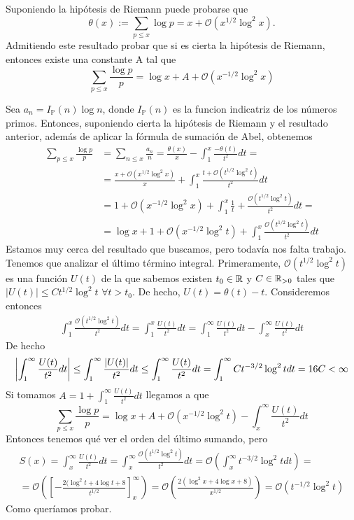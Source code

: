 \documentclass[twoside]{article}
\providecommand{\bo}[1]{\mathcal{O}\left(#1\right)}
\begin{document}
\begin{ejercicio}{12}
Suponiendo la hipótesis de Riemann puede probarse que
$$
\theta(x):=\sum_{p\leq x}\log p = x + \mathcal{O}(x^{1/2}\log^2x).
$$
Admitiendo este resultado probar que si es cierta la hipótesis de Riemann, entonces existe una constante A tal que
$$
\sum_{p\leq x}\frac{\log p}{p} = \log x + A + \mathcal{O}(x^{-1/2}\log^2 x)
$$
\begin{sol}
Sea $a_n = I_{\mathbb{P}}(n)\log n$, donde $I_{\mathbb{P}}(n)$ es la funcion indicatriz de los números primos. Entonces, suponiendo cierta la hipótesis de Riemann y el resultado anterior, además de aplicar la fórmula de sumación de Abel, obtenemos
\begin{align*}
\sum_{p\leq x}\frac{\log p}{p} &= \sum_{n\leq x}\frac{a_n}{n} = \frac{\theta(x)}{x} - \int_1^x \frac{-\theta(t)}{t^2}dt =\\
&= \frac{x + \mathcal{O}(x^{1/2}\log^2x)}{x} + \int_1^x \frac{t + \mathcal{O}(t^{1/2}\log^2t)}{t^2}dt\\
 &= 1+\mathcal{O}(x^{-1/2}\log^2 x) + \int_1^x \frac{1}{t} + \frac{\mathcal{O}(t^{1/2}\log^2 t)}{t^2}dt =\\
&=\log x + 1 + \mathcal{O}(x^{-1/2}\log^2 t)  + \int_1^x \frac{\mathcal{O}(t^{1/2}\log^2 t)}{t^2}dt
\end{align*}
Estamos muy cerca del resultado que buscamos, pero todavía nos falta trabajo. Tenemos que analizar el último término integral. Primeramente, $\mathcal{O}(t^{1/2}\log^2 t)$ es una función $U(t)$ de la que sabemos existen $t_0 \in \mathbb{R}$ y $C\in\mathbb{R}_{>0}$ tales que $|U(t)|\leq Ct^{1/2}\log^2 t$ $\forall t>t_0$. De hecho, $U(t)=\theta(t)-t$. Consideremos entonces
\begin{gather*}
\int_1^x \frac{\mathcal{O}(t^{1/2}\log^2 t)}{t^2}dt = \int_1^x \frac{U(t)}{t^2}dt = \int_1^\infty \frac{U(t)}{t^2}dt - \int_x^\infty \frac{U(t)}{t^2}dt
\end{gather*}
De hecho
$$
\left|{\int_1^\infty \frac{U(t)}{t^2}dt}\right| \leq \int_1^\infty \frac{\left|{U(t)}\right|}{t^2}dt \leq \int_1^\infty \frac{U(t)}{t^2}dt =\int_1^\infty  Ct^{-3/2}\log^2 t dt =16C<\infty
$$ Si tomamos $A = 1 + \int_1^\infty \frac{U(t)}{t^2}dt$ llegamos a que
$$
\sum_{p\leq x}\frac{\log p}{p} = \log x + A + \mathcal{O}(x^{-1/2}\log^2 t) - \int_x^\infty \frac{U(t)}{t^2}dt
$$
Entonces tenemos qué ver el orden del último sumando, pero
\begin{gather*}
S(x)= \int_x^\infty \frac{U(t)}{t^2}dt = \int_x^\infty \frac{\mathcal{O}(t^{1/2}\log^2 t)}{t^2}dt = \bo{\int_x^\infty  {t^{-3/2}\log^2 t}dt}=\\
=\bo{\left[-\frac{2(\log^2 t+4\log t + 8}{t^{1/2}}\right]_x^\infty }= \bo{\frac{2(\log^2 x+4\log x + 8)}{x^{1/2}}} = \mathcal{O}(t^{-1/2}\log^2 t)
\end{gather*}
Como queríamos probar.
\end{sol}
\end{ejercicio}
\end{document}
